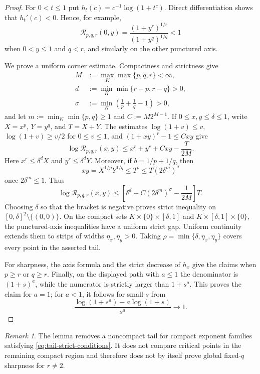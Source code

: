 \documentclass[11pt,reqno]{amsart}
\numberwithin{equation}{section}
\theoremstyle{definition}
\theoremstyle{remark}
\newtheorem{remark}[remark]{Remark}
\begin{document}
\begin{proof}
For $0<t\le1$ put $h_t(c)=c^{-1}\log(1+t^c)$.  Direct differentiation
shows that $h_t'(c)<0$.  Hence, for example,
\[
  \mathcal R_{p,q,r}(0,y)
  =\frac{(1+y^r)^{1/r}}{(1+y^q)^{1/q}}<1
\]
when $0<y\le1$ and $q<r$, and similarly on the other punctured axis.

We prove a uniform corner estimate.  Compactness and strictness give
\begin{align*}
  M&:=\max_K\max\{p,q,r\}<\infty,\\
  d&:=\min_K\min\{r-p,r-q\}>0,\\
  \sigma&:=\min_K\left(\frac1p+\frac1q-1\right)>0,
\end{align*}
and let $m:=\min_K\min\{p,q\}\ge1$ and $C:=M2^{M-1}$.  If
$0\le x,y\le\delta\le1$, write $X=x^p$, $Y=y^q$, and $T=X+Y$.
The estimates $\log(1+v)\le v$, $\log(1+v)\ge v/2$ for $0\le v\le1$,
and $(1+xy)^r-1\le Cxy$ give
\[
  \log\mathcal R_{p,q,r}(x,y)
  \le x^r+y^r+Cxy-\frac{T}{2M}.
\]
Here $x^r\le\delta^dX$ and $y^r\le\delta^dY$.  Moreover, if
$b=1/p+1/q$, then
\[
  xy=X^{1/p}Y^{1/q}\le T^b
  \le T(2\delta^m)^\sigma
\]
once $2\delta^m\le1$.  Thus
\[
  \log\mathcal R_{p,q,r}(x,y)
  \le
  \left[\delta^d+C(2\delta^m)^\sigma-\frac1{2M}\right]T.
\]
Choosing $\delta$ so that the bracket is negative proves strict inequality
on $[0,\delta]^2\setminus\{(0,0)\}$.  On the compact sets
$K\times\{0\}\times[\delta,1]$ and
$K\times[\delta,1]\times\{0\}$, the punctured-axis inequalities have a
uniform strict gap.  Uniform continuity extends them to strips of widths
$\eta_x,\eta_y>0$.  Taking
$\rho=\min\{\delta,\eta_x,\eta_y\}$ covers every point in the asserted tail.

For sharpness, the axis formula and the strict decrease of $h_x$ give the
claims when $p\ge r$ or $q\ge r$.  Finally, on the displayed path with
$a\le1$ the denominator is $(1+s)^a$, while the numerator is strictly larger
than $1+s^a$.  This proves the claim for $a=1$; for $a<1$, it follows for
small $s$ from
\[
  \frac{\log(1+s^a)-a\log(1+s)}{s^a}\longrightarrow1.
\]
\end{proof}

\begin{remark}\label{rem:tail-role}
The lemma removes a noncompact tail for compact exponent families satisfying
\eqref{eq:tail-strict-conditions}.  It does not compare critical points in the
remaining compact region and therefore does not by itself prove global
fixed-$q$ sharpness for $r\ne2$.
\end{remark}
\end{document}
